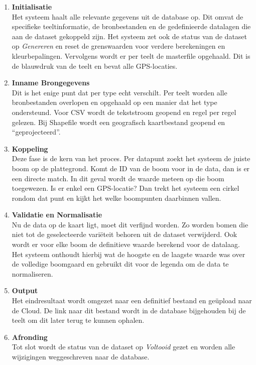 \begin{enumerate}
    \label{pr:flow-generatie}
    \item \textbf{Initialisatie} \\
    Het systeem haalt alle relevante gegevens uit de database op. Dit omvat de specifieke teeltinformatie, de bronbestanden en de gedefinieerde datalagen die aan de dataset gekoppeld zijn. Het systeem zet ook de status van de dataset op \textit{Genereren} en reset de grenswaarden voor verdere berekeningen en kleurbepalingen. Vervolgens wordt er per teelt de masterfile opgehaald. Dit is de blauwdruk van de teelt en bevat alle GPS-locaties.
    \item \textbf{Inname Brongegevens} \\
    Dit is het enige punt dat per type echt verschilt. Per teelt worden alle bronbestanden overlopen en opgehaald op een manier dat het type ondersteund. Voor CSV wordt de tekststroom geopend en regel per regel gelezen. Bij Shapefile wordt een geografisch kaartbestand geopend en ``geprojecteerd''.
    \item \textbf{Koppeling} \\
    Deze fase is de kern van het proces. Per datapunt zoekt het systeem de juiste boom op de plattegrond. Komt de ID van de boom voor in de data, dan is er een directe match. In dit geval wordt de waarde meteen op die boom toegewezen. Is er enkel een GPS-locatie? Dan trekt het systeem een cirkel rondom dat punt en kijkt het welke boompunten daarbinnen vallen.
    \item \textbf{Validatie en Normalisatie} \\
    Nu de data op de kaart ligt, moet dit verfijnd worden. Zo worden bomen die niet tot de geselecteerde variëteit behoren uit de dataset verwijderd. Ook wordt er voor elke boom de definitieve waarde berekend voor de datalaag. Het systeem onthoudt hierbij wat de hoogste en de laagste waarde was over de volledige boomgaard en gebruikt dit voor de legenda om de data te normaliseren.
    \item \textbf{Output} \\
    Het eindresultaat wordt omgezet naar een definitief bestand en geüpload naar de Cloud. De link naar dit bestand wordt in de database bijgehouden bij de teelt om dit later terug te kunnen ophalen.
    \item \textbf{Afronding} \\
    Tot slot wordt de status van de dataset op \textit{Voltooid} gezet en worden alle wijzigingen weggeschreven naar de database.
\end{enumerate}

